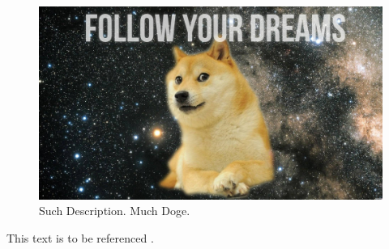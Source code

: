 \documentclass{article}
\begin{document}
\begin{figure}[htbp]
    \centering
    \includegraphics[width=1\textwidth]{sharelatex.jpg}
    \caption[Description for list of figures]{Such Description. Much Doge.}
    \label{fig:my_figure}
\end{figure}

This text is to be referenced \cite{Schildt2014JavaReference}.

\printbibliography

\pagebreak

\inputminted{java}{ApplicationMain.java}
\end{document}

